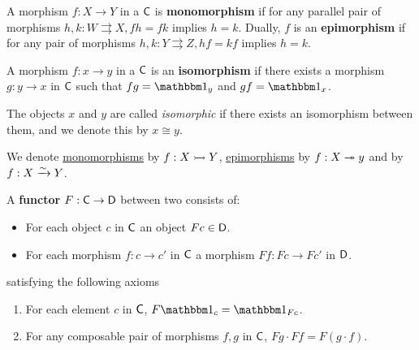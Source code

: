 \documentclass[../main.tex]{subfiles}
\begin{document}
\begin{definition} \label{def:mono-epi-morphism}
  A morphism \(f: X \to Y\) in a  \(\mathsf{C}\) is \textbf{monomorphism} if for any parallel pair of morphisms \(h, k: W \rightrightarrows X, fh = fk\) implies \(h = k\).
  Dually, \(f\) is an \textbf{epimorphism} if for any pair of morphisms \(h, k: Y \rightrightarrows Z, hf = kf\) implies \(h = k\).
\end{definition}

\begin{definition}[Isomorphism] \label{def:categorical-isomorphism}
  A morphism \(f: x \to y\) in a  \(\mathsf{C}\) is an \textbf{isomorphism} if there exists a morphism \(g: y \to x\) in \(\mathsf{C}\) such that \(fg = \id_{y}\) and \(gf = \id_{x}\).

  The objects \(x\) and \(y\) are called \textit{isomorphic} if there exists an isomorphism between them, and we denote this by \(x \cong y\).
\end{definition}

\begin{notation}
  We denote \hyperref[def:mono-epi-morphism]{monomorphisms} by \(f: X \rightarrowtail Y\), \hyperref[def:mono-epi-morphism]{epimorphisms} by \(f: X \twoheadrightarrow y\) and  by \(f: X \xrightarrow{\sim} Y\).
\end{notation}


\begin{definition}[Functor] \label{def:functor}
  A \textbf{functor} \(F: \mathsf{C} \to \mathsf{D}\) between two  consists of:
  \begin{itemize}
    \item For each object \(c\) in \(\mathsf{C}\) an object \(Fc \in \mathsf{D}\).
    \item For each morphism \(f: c \to c'\) in \(\mathsf{C}\) a morphism \(Ff: Fc \to Fc'\) in \(\mathsf{D}\).
  \end{itemize}
  satisfying the following axioms
  \begin{enumerate}
    \item For each element \(c\) in \(\mathsf{C}\), \(F \id_{c} = \id_{Fc}\).
    \item For any composable pair of morphisms \(f, g\) in \(\mathsf{C}\), \(Fg \cdot Ff = F(g \cdot f)\).
  \end{enumerate}
\end{definition}
\end{document}
